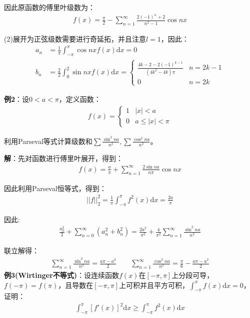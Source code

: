 \documentclass{ctexart}
\let\oldtextbf\textbf
\renewcommand{\textbf}[1]{\textcolor{brown!50!red}{\oldtextbf{#1}}}
\begin{document}
因此原函数的傅里叶级数为：
\begin{align*}
    f(x)=\frac{\pi}{2}-\sum_{n=1}^\infty \frac{2(-1)^n+2}{n^2-1}\cos nx
\end{align*}

(2)展开为正弦级数需要进行奇延拓，并且注意$l=1$，因此：
\begin{align*}
a_n&=\frac{1}{\pi}\int_{-\pi}^\pi \cos nxf(x)\mathrm{d}x=0\\
b_n&=\frac{2}{2}\int_{0}^2 \sin nxf(x)\mathrm{d}x=\begin{cases}
\frac{4k-2-2(-1)^{k-1}}{(4k^2-4k)\pi} & n=2k-1\\
0 &n=2k
\end{cases}  
\end{align*}

\textbf{\color{brown!50!red}例2}：设$0<a<\pi$，定义函数：
\begin{align*}
    f(x)=\begin{cases}
        1&|x|<a\\
        0 & a\leq |x|<\pi
    \end{cases}
\end{align*}

利用Parseval等式计算级数和$\sum \frac{\sin ^2 na}{n^2},\sum \frac{\cos ^2 na}{n^2}$。

\textbf{\color{brown!50!red}解}：先对函数进行傅里叶展开，得到：
\begin{align*}
    f(x)=\frac{a}{\pi}+\sum_{n=1}^\infty\frac{2\sin na}{n\pi}\cos nx
\end{align*}

因此利用Parseval恒等式，得到：
\begin{align*}
    ||f||_2^2=\frac{1}{\pi}\int_{-\pi}^\pi f^2(x)\mathrm{d}x=\frac{2a}{\pi}
\end{align*}

因此:
\begin{align*}
    \frac{a_0^2}{2}+\sum_{n=0}^\infty (a_n^2+b_n^2)=\frac{2a^2}{\pi^2}+\frac{4}{\pi^2}\sum_{n=1}^\infty \frac{\sin ^2 na}{n^2}
\end{align*}

联立解得：
\begin{align*}
    \sum_{n=1}^\infty \frac{\sin ^2 na}{n^2}=\frac{a\pi-a^2}{2}\qquad 
     \sum_{n=1}^\infty \frac{\cos ^2 na}{n^2}=\frac{\pi}{6}-\frac{a\pi-a^2}{2}
\end{align*}
\textbf{\color{brown!50!red}例3(Wirtinger不等式)}：设连续函数$f(x)$在$[-\pi,\pi]$上分段可导，$f(-\pi)=f(\pi)$，且导数在$[-\pi,\pi]$上可积并且平方可积，$\int_{-\pi}^\pi f(x)\mathrm{d}x=0$，证明：
\begin{align*}
    \int_{-\pi}^\pi [f'(x)]^2\mathrm{d}x\geq \int_{-\pi}^\pi f^2(x)\mathrm{d}x
\end{align*}
\end{document}
